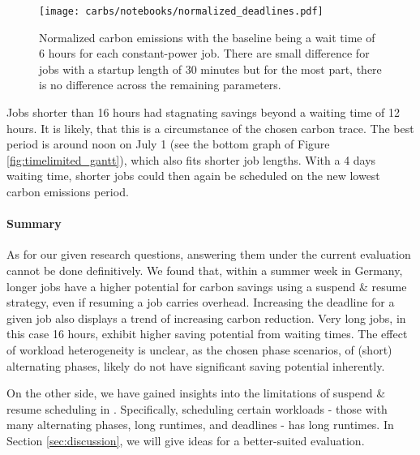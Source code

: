 \begin{figure}[H]
    \texttt{[image: carbs/notebooks/normalized\_deadlines.pdf]}
    \caption[short]{
        Normalized carbon emissions with the baseline being a wait time of 6 hours for each constant-power job. 
        There are small difference for jobs with a startup length of 30 minutes but for the most part, there is no difference across the remaining parameters.
    }

    \label{fig:different_deadlines_normalized}
\end{figure}

Jobs shorter than 16 hours had stagnating savings beyond a waiting time of 12 hours. 
It is likely, that this is a circumstance of the chosen carbon trace.
The best period is around noon on July 1 (see the bottom graph of Figure \ref{fig:timelimited_gantt}), which also fits shorter job lengths. 
With a 4 days waiting time, shorter jobs could then again be scheduled on the new lowest carbon emissions period.

\paragraph{Summary}

As for our given research questions, answering them under the current evaluation cannot be done definitively. We found that, within a summer week in Germany, longer jobs have a higher potential for carbon savings using a suspend \& resume strategy, even if resuming a job carries overhead. Increasing the deadline for a given job also displays a trend of increasing carbon reduction. 
Very long jobs, in this case 16 hours, exhibit higher saving potential from waiting times.
The effect of workload heterogeneity is unclear, as the chosen phase scenarios, of (short) alternating phases, likely do not have significant saving potential inherently.

On the other side, we have gained insights into the limitations of suspend \& resume scheduling in \programname{}. Specifically, scheduling certain workloads - those with many alternating phases, long runtimes, and deadlines - has long runtimes.
In Section \ref{sec:discussion}, we will give ideas for a better-suited evaluation.
